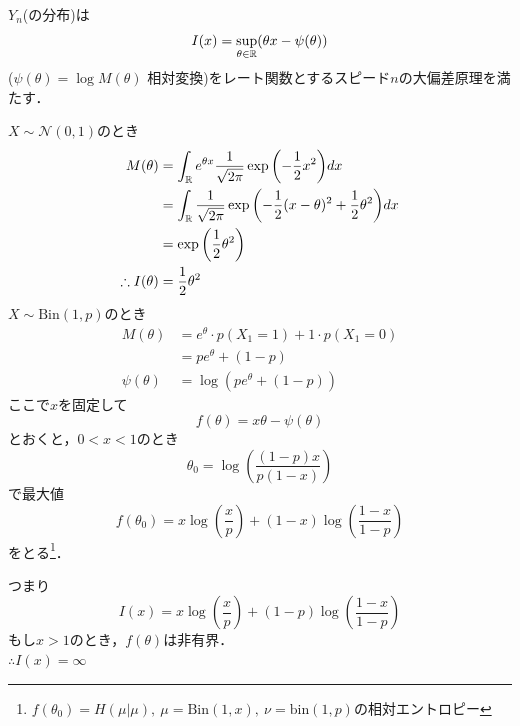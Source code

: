     $Y_n$(の分布)は
\begin{equation}
    I(x)= \sup_{\theta\in \mathbb{R}}(\theta x- \psi(\theta))
\end{equation}
    ($\psi(\theta)= \log{M(\theta)}$ 相対変換)をレート関数とするスピード$n$の大偏差原理を満たす．

    $X\sim \mathcal{N}(0, 1)$のとき
\begin{align}
    M(\theta)
    &= \int_{\mathbb{R}} e^{\theta x} \frac{1}{\sqrt{2\pi}}\exp{\left(-\frac{1}{2}x^2\right)}dx\\
    &= \int_{\mathbb{R}}\frac{1}{\sqrt{2\pi}}\exp{\left(-\frac{1}{2}(x- \theta)^2+ \frac{1}{2}\theta^2\right)}dx\\
    &= \exp{\left(\frac{1}{2}\theta^2\right)}\\
    \therefore I(\theta)&= \frac{1}{2}\theta^2
\end{align}
$X\sim \mathrm{Bin}(1, p)$のとき
\begin{align}
    M(\theta)
    &= e^\theta\cdot p(X_1= 1)+ 1\cdot p(X_1= 0)\\
    &= pe^\theta+ (1- p)\\
    \psi(\theta)&= \log{(pe^\theta+ (1- p))}
\end{align}
    ここで$x$を固定して
\begin{equation}
    f(\theta)= x\theta- \psi(\theta)
\end{equation}
    とおくと，$0< x< 1$のとき
\begin{equation}
    \theta_0= \log{\left(\frac{(1- p)x}{p(1- x)}\right)}
\end{equation}
    で最大値
\begin{equation}
    f(\theta_0)= x\log{\left(\frac{x}{p}\right)}+ (1- x)\log{\left(\frac{1- x}{1- p}\right)}
\end{equation}
    をとる\footnote{$f(\theta_0)= H(\mu|\mu),\ \mu= \mathrm{Bin}(1, x),\ \nu= \mathrm{bin}(1, p)$の相対エントロピー}．

    つまり
\begin{equation}
    I(x)= x\log{\left(\frac{x}{p}\right)}+ (1- p)\log{\left(\frac{1- x}{1- p}\right)}
\end{equation}
    もし$x> 1$のとき，$f(\theta)$は非有界．\\
    $\therefore I(x)= \infty$

